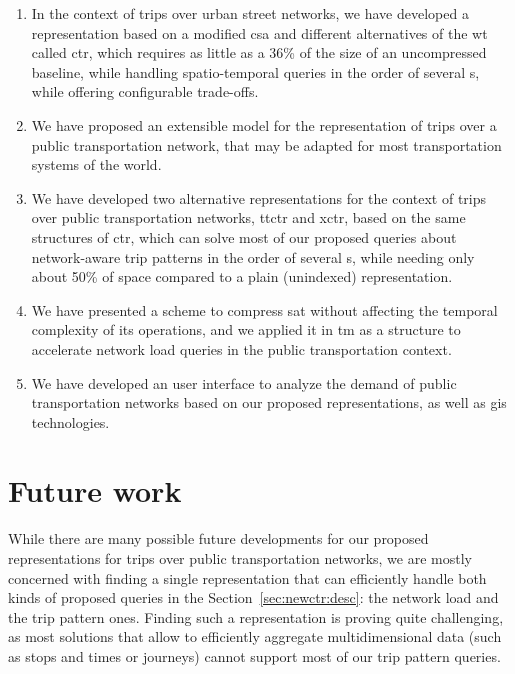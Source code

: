 \documentclass[a4paper,10pt,twoside]{book}
\begin{document}
	\begin{enumerate}
	    \item In the context of trips over urban street networks, we have developed a representation based on a modified \gls{csa} and different alternatives of the \gls{wt} called \gls{ctr}, which requires as little as a 36\% of the size of an uncompressed baseline, while handling spatio-temporal queries in the order of several \micro s, while offering configurable trade-offs.
	    
	    \item We have proposed an extensible model for the representation of trips over a public transportation network, that may be adapted for most transportation systems of the world.
	    
	    \item We have developed two alternative representations for the context of trips over public transportation networks, \gls{ttctr} and \gls{xctr}, based on the same structures of \gls{ctr}, which can solve most of our proposed queries about network-aware trip patterns in the order of several \micro s, while needing only about 50\% of space compared to a plain (unindexed) representation.
	    
	    \item We have presented a scheme to compress \gls{sat} without affecting the temporal complexity of its operations, and we applied it in \gls{tm} as a structure to accelerate network load queries in the public transportation context.
	    
	    \item We have developed an user interface to analyze the demand of public transportation networks based on our proposed representations, as well as \gls{gis} technologies. 
	\end{enumerate}
	
	\section{Future work}
	While there are many possible future developments for our proposed representations for trips over public transportation networks, we are mostly concerned with finding a single representation that can efficiently handle both kinds of proposed queries in the Section~\ref{sec:newctr:desc}: the network load and the trip pattern ones. Finding such a representation is proving quite challenging, as most solutions that allow to efficiently aggregate multidimensional data (such as stops and times or journeys) cannot support most of our trip pattern queries.
	
\end{document}
